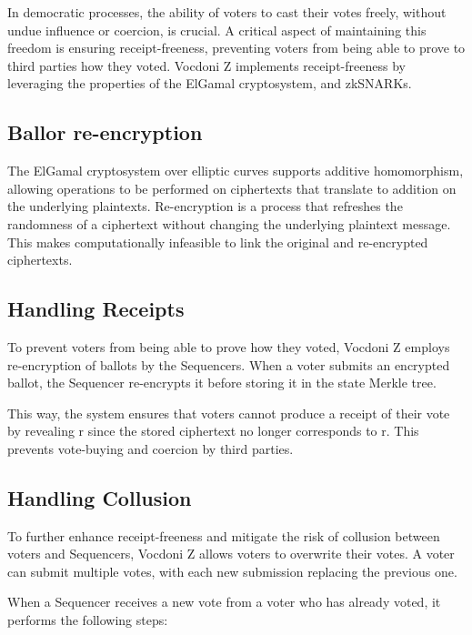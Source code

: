 
In democratic processes, the ability of voters to cast their votes freely, without undue influence or coercion, is crucial. A critical aspect of maintaining this freedom is ensuring receipt-freeness, preventing voters from being able to prove to third parties how they voted. Vocdoni Z implements receipt-freeness by leveraging the properties of the ElGamal cryptosystem, and zkSNARKs.

\subsection{Ballor re-encryption}

The ElGamal cryptosystem over elliptic curves supports additive homomorphism, allowing operations to be performed on ciphertexts that translate to addition on the underlying plaintexts. Re-encryption is a process that refreshes the randomness of a ciphertext without changing the underlying plaintext message. This makes computationally infeasible to link the original and re-encrypted ciphertexts.

\subsection{Handling Receipts}

To prevent voters from being able to prove how they voted, Vocdoni Z employs re-encryption of ballots by the Sequencers. When a voter submits an encrypted ballot, the Sequencer re-encrypts it before storing it in the state Merkle tree.

This way, the system ensures that voters cannot produce a receipt of their vote by revealing r since the stored ciphertext no longer corresponds to r. This prevents vote-buying and coercion by third parties.

\subsection{Handling Collusion}

To further enhance receipt-freeness and mitigate the risk of collusion between voters and Sequencers, Vocdoni Z allows voters to overwrite their votes. A voter can submit multiple votes, with each new submission replacing the previous one.

When a Sequencer receives a new vote from a voter who has already voted, it performs the following steps:

